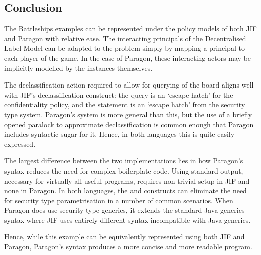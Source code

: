 \subsection{Conclusion}

The Battleships examples can be represented under the policy models of both JIF and Paragon with relative ease. The interacting principals of the Decentralised Label Model can be adapted to the problem simply by mapping a principal to each player of the game. In the case of Paragon, these interacting actors may be implicitly modelled by the  instances themselves.

The declassification action required to allow for querying of the board aligns well with JIF's declassification construct: the query is an `escape hatch' for the confidentiality policy, and the  statement is an `escape hatch' from the security type system. Paragon's system is more general than this, but the use of a briefly opened paralock to approximate declassification is common enough that Paragon includes syntactic sugar for it. Hence, in both languages this is quite easily expressed.

The largest difference between the two implementations lies in how Paragon's syntax reduces the need for complex boilerplate code. Using standard output, necessary for virtually all useful programs, requires non-trivial setup in JIF and none in Paragon. In both languages, the  and  constructs can eliminate the need for security type parametrisation in a number of common scenarios. When Paragon does use security type generics, it extends the standard Java generics syntax where JIF uses entirely different syntax incompatible with Java generics.

Hence, while this example can be equivalently represented using both JIF and Paragon, Paragon's syntax produces a more concise and more readable program.
